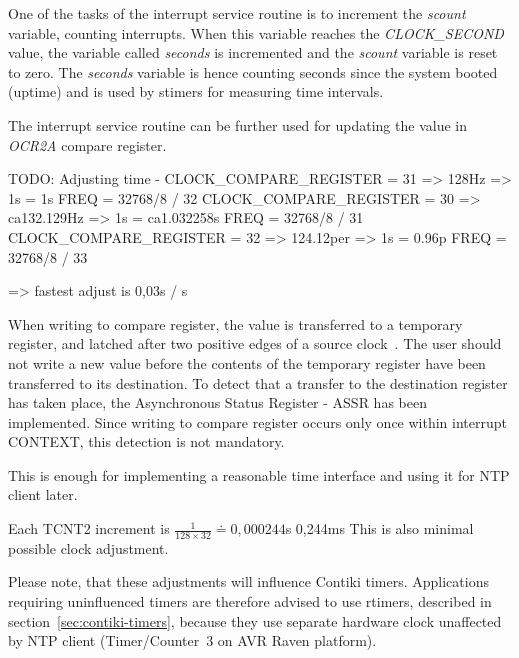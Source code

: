 One of the tasks of the interrupt service routine is to increment the {\it{scount}} variable,
counting interrupts.
When this variable reaches the {\it{CLOCK\_SECOND}} value, the variable called
{\it{seconds}} is incremented and the {\it{scount}} variable is reset to zero.
The {\it{seconds}} variable is hence counting seconds since the system booted (uptime)
and is used by stimers for measuring time intervals.

The interrupt service routine can be further used for updating the value in {\it{OCR2A}} compare register.

TODO:
Adjusting time - CLOCK\_COMPARE\_REGISTER = 31 => 128Hz => 1s = 1s
FREQ = 32768/8 / 32
CLOCK\_COMPARE\_REGISTER = 30 => ca132.129Hz => 1s = ca1.032258s
FREQ = 32768/8 / 31
CLOCK\_COMPARE\_REGISTER = 32 => 124.12per => 1s = 0.96p
FREQ = 32768/8 / 33

=> fastest adjust is 0,03s / s

When writing to compare register, the value is transferred to a
temporary register, and latched after two positive edges of a source clock~\cite{avr-datasheet}.
The user should not write a new value before the contents
of the temporary register have been transferred to its destination.
To detect that a transfer to the destination register has taken place,
the Asynchronous Status Register - ASSR has been implemented.
Since writing to compare register occurs only once within interrupt CONTEXT, %
this detection is not mandatory.



This is enough for implementing a reasonable time interface and using it for NTP client later.



Each TCNT2 increment is $\frac{1}{128 \times 32} \doteq 0,000244$s
0,244ms
This is also minimal possible clock adjustment.


Please note, that these adjustments will influence Contiki timers.
Applications requiring uninfluenced timers
are therefore advised to use rtimers, described in section~\ref{sec:contiki-timers},
because they use separate hardware clock unaffected by NTP client
(Timer/Counter~3 on AVR Raven platform).
